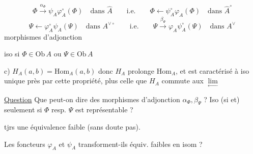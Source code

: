 \[
\boxed{\Phi\xrightarrow{\alpha_\Phi}\psi_A\varphi_A^\circ(\Phi)}\quad\text{dans }\widehat A
\qquad\text{i.e.}\qquad
\Phi\longleftarrow\psi_A^\circ\varphi_A(\Phi)\quad\text{dans }\widehat A^\circ
\]
\[
\Psi\longleftarrow\varphi_A^\circ\psi_A(\Psi)\quad\text{dans }A^{\vee\circ}
\qquad\text{i.e.}\qquad
\boxed{\Psi\xrightarrow{\beta_\Psi}\varphi_A\psi_A^\circ(\Psi)\quad\text{dans }A^\vee}
\]
\unsure{\S} morphismes d'adjonction

iso si $\Phi\in\mathrm{Ob}\,A$ ou $\Psi\in\mathrm{Ob}\,A$

c) \(\boxed{H_A(a,b)=\mathrm{Hom}_A(a,b)}\)
donc $H_A$ prolonge $\mathrm{Hom}_A$, et est caractérisé à iso unique près par cette propriété,
plus celle que $H_A$ commute aux $\underset{\leftarrow}{\lim}$
\inserted{\[
\left[\begin{aligned}
H_A(\Phi,b)&\simeq\mathrm{Hom}_{\widehat A}(\Phi,b)\\
H_A(a,\Psi)&\simeq\mathrm{Hom}_{A^\vee}(\Psi,a)=\mathrm{Hom}_{A^{\vee\circ}}(a,\Psi)
\end{aligned}\right]
\]}

\uline{Question} Que peut-on dire des morphismes d'adjonction
$\alpha_\Phi,\beta_\Psi$ ? Iso (si et) seulement si $\Phi$ resp. $\Psi$ est représentable ?

 tjrs une équivalence faible (sans doute pas).

Les foncteurs $\varphi_A$ et $\psi_A$ transforment-ils équiv. faibles en isom ?

